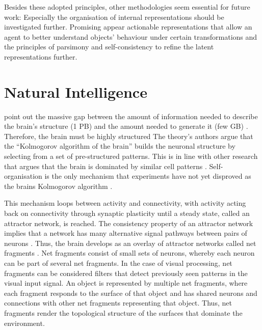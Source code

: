 Besides these adopted principles, other methodologies seem essential for future work: Especially the organisation of internal representations should be investigated further. Promising appear actionable representations that allow an agent to better understand objects' behaviour under certain transformations and the principles of parsimony and self-consistency to refine the latent representations further.

\section{Natural Intelligence}
 point out the massive gap between the amount of information needed to describe the brain's structure (1 PB) and the amount needed to generate it (few GB) . Therefore, the brain must be highly structured \cite{gazzaniga_organization_1989, ackerman_discovering_1992, bassett_understanding_2011}
The theory's authors argue that the ``Kolmogorov algorithm  of the brain'' builds the neuronal structure by selecting from a set of pre-structured patterns. This is in line with other research that argues that the brain is dominated by similar cell patterns .
Self-organisation is the only mechanism that experiments have not yet disproved as the brains Kolmogorov algorithm \cite{willshaw_how_1976, willshaw_marker_1979, singer_brain_1986, kelso_selforganizing_1995, kelso_dynamic_1999}.

This mechanism loops between activity and connectivity, with activity acting back on connectivity through synaptic plasticity until a steady state, called an attractor network, is reached.
The consistency property of an attractor network implies that a network has many alternative signal pathways between pairs of neurons .
Thus, the brain develops as an overlay of attractor networks called net fragments .
Net fragments consist of small sets of neurons, whereby each neuron can be part of several net fragments.
In the case of visual processing, net fragments can be considered filters that detect previously seen patterns in the visual input signal.
An object is represented by multiple net fragments, where each fragment responds to the surface of that object and has shared neurons and connections with other net fragments representing that object.
Thus, net fragments render the topological structure of the surfaces that dominate the environment.

